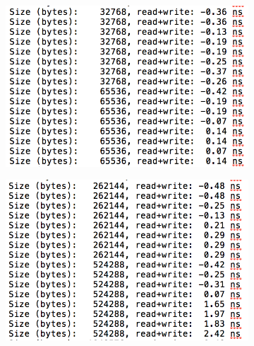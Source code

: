 \begin{figure}[ht]
\centering
    \begin{subfigure}{0.4\textwidth}
    \includegraphics[width=\linewidth]{Week4/fig/L1Miss.png} 
    \caption{ }
    \label{fig:L1}
    \end{subfigure} 
    
    \begin{subfigure}{0.4\textwidth}
    \includegraphics[width=\linewidth]{Week4/fig/L2Miss.png}
    \caption{ }
    \label{fig:L2}
    \end{subfigure}
    

\end{figure}
